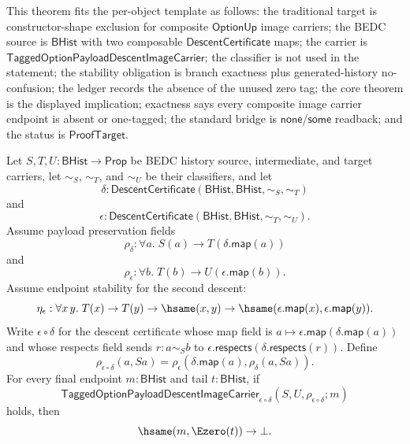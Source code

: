 
\begin{theorem}
\label{thm:tagged-option-composite-image-carrier-zero-endpoint-exclusion}
This theorem fits the per-object template as follows: the traditional target is
constructor-shape exclusion for composite $\mathsf{OptionUp}$ image carriers;
the BEDC source is $\mathsf{BHist}$ with two composable
$\mathsf{DescentCertificate}$ maps; the carrier is
$\mathsf{TaggedOptionPayloadDescentImageCarrier}$; the classifier is not used in
the statement; the stability obligation is branch exactness plus
generated-history no-confusion; the ledger records the absence of the unused
zero tag; the core theorem is the displayed implication; exactness says every
composite image carrier endpoint is absent or one-tagged; the standard bridge
is $\mathsf{none}$/$\mathsf{some}$ readback; and the status is
$\mathsf{ProofTarget}$.

Let $S,T,U:\mathsf{BHist}\to\mathsf{Prop}$ be BEDC history source,
intermediate, and target carriers, let $\sim_S$, $\sim_T$, and $\sim_U$ be their
classifiers, and let
$$
\delta:\mathsf{DescentCertificate}(\mathsf{BHist},\mathsf{BHist},\sim_S,\sim_T)
$$
and
$$
\epsilon:\mathsf{DescentCertificate}(\mathsf{BHist},\mathsf{BHist},\sim_T,\sim_U).
$$
Assume payload preservation fields
$$
\rho_{\delta}:\forall a.\;S(a)\to T(\delta.\mathsf{map}(a))
$$
and
$$
\rho_{\epsilon}:\forall b.\;T(b)\to U(\epsilon.\mathsf{map}(b)).
$$
Assume endpoint stability for the second descent:
$$
\eta_{\epsilon}:\forall x\,y.\;
T(x)\to T(y)\to \hsame(x,y)\to
\hsame(\epsilon.\mathsf{map}(x),\epsilon.\mathsf{map}(y)).
$$
Write $\epsilon\circ\delta$ for the descent certificate whose map field is
$a\mapsto\epsilon.\mathsf{map}(\delta.\mathsf{map}(a))$ and whose respects field
sends $r:a\sim_S b$ to
$\epsilon.\mathsf{respects}(\delta.\mathsf{respects}(r))$. Define
$$
\rho_{\epsilon\circ\delta}(a,Sa)=
\rho_{\epsilon}(\delta.\mathsf{map}(a),\rho_{\delta}(a,Sa)).
$$
For every final endpoint $m:\mathsf{BHist}$ and tail $t:\mathsf{BHist}$, if
$$
\mathsf{TaggedOptionPayloadDescentImageCarrier}_{\epsilon\circ\delta}
(S,U,\rho_{\epsilon\circ\delta};m)
$$
holds, then
$$
\hsame(m,\Ezero(t))\to\bot.
$$
\end{theorem}
